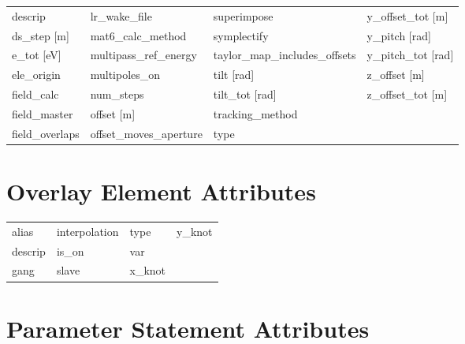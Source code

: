 \begin{tabular}{llll}
descrip                          & lr_wake_file                     & superimpose                      & y_offset_tot [m]                 \\
ds_step [m]                      & mat6_calc_method                 & symplectify                      & y_pitch [rad]                    \\
e_tot [eV]                       & multipass_ref_energy             & taylor_map_includes_offsets      & y_pitch_tot [rad]                \\
ele_origin                       & multipoles_on                    & tilt [rad]                       & z_offset [m]                     \\
field_calc                       & num_steps                        & tilt_tot [rad]                   & z_offset_tot [m]                 \\
field_master                     & offset [m]                       & tracking_method                  &                                  \\
field_overlaps                   & offset_moves_aperture            & type                             &                                  \\
 \bottomrule
 \end{tabular}
 \vfill
 
 \section{Overlay Element Attributes}
 \label{s:list.overlay}
 
 \begin{tabular}{llll} \toprule
alias                            & interpolation                    & type                             & y_knot                           \\
descrip                          & is_on                            & var                              &                                  \\
gang                             & slave                            & x_knot                           &                                  \\
 \bottomrule
 \end{tabular}
 \vfill
 
 \section{Parameter Statement Attributes}
 \label{s:list.parameter}
 
